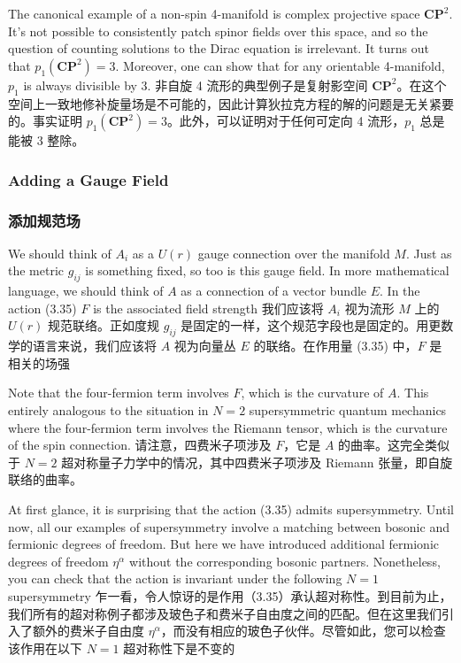 \documentclass{ctexart}
\begin{document}
\begin{paracol}{2}
The canonical example of a non-spin 4-manifold is complex projective space $\mathbf{CP}^2$. It’s not possible to consistently patch spinor fields over this space, and so the question of counting solutions to the Dirac equation is irrelevant. It turns out that $p_1(\mathbf{CP}^2) = 3$. Moreover, one can show that for any orientable 4-manifold, $p_1$ is always divisible by 3.
\switchcolumn
非自旋 4 流形的典型例子是复射影空间 $\mathbf{CP}^2$。在这个空间上一致地修补旋量场是不可能的，因此计算狄拉克方程的解的问题是无关紧要的。事实证明 $p_1(\mathbf{CP}^2) = 3$。此外，可以证明对于任何可定向 4 流形，$p_1$ 总是能被 3 整除。
\switchcolumn*

\subsubsection{Adding a Gauge Field}
\switchcolumn
\subsubsection*{添加规范场}
\switchcolumn*

We should think of $A_i$ as a $U(r)$ gauge connection over the manifold $M$. Just as the metric $g_{ij}$ is something fixed, so too is this gauge field. In more mathematical language, we should think of $A$ as a connection of a vector bundle $E$. In the action (3.35) $F$ is the associated field strength
\switchcolumn
我们应该将 $A_i$ 视为流形 $M$ 上的 $U(r)$ 规范联络。正如度规 $g_{ij}$ 是固定的一样，这个规范字段也是固定的。用更数学的语言来说，我们应该将 $A$ 视为向量丛 $E$ 的联络。在作用量 (3.35) 中，$F$ 是相关的场强
\switchcolumn*

Note that the four-fermion term involves $F$, which is the curvature of $A$. This entirely analogous to the situation in $N = 2$ supersymmetric quantum mechanics where the four-fermion term involves the Riemann tensor, which is the curvature of the spin connection.
\switchcolumn
请注意，四费米子项涉及 $F$，它是 $A$ 的曲率。这完全类似于 $N = 2$ 超对称量子力学中的情况，其中四费米子项涉及 Riemann 张量，即自旋联络的曲率。
\switchcolumn*

At first glance, it is surprising that the action (3.35) admits supersymmetry. Until now, all our examples of supersymmetry involve a matching between bosonic and fermionic degrees of freedom. But here we have introduced additional fermionic degrees of freedom $\eta^{\alpha}$ without the corresponding bosonic partners. Nonetheless, you can check that the action is invariant under the following $N = 1$ supersymmetry
\switchcolumn
乍一看，令人惊讶的是作用（3.35）承认超对称性。到目前为止，我们所有的超对称例子都涉及玻色子和费米子自由度之间的匹配。但在这里我们引入了额外的费米子自由度 $\eta^{\alpha}$，而没有相应的玻色子伙伴。尽管如此，您可以检查该作用在以下 $N = 1$ 超对称性下是不变的
\switchcolumn*


\end{paracol}
\end{document}
